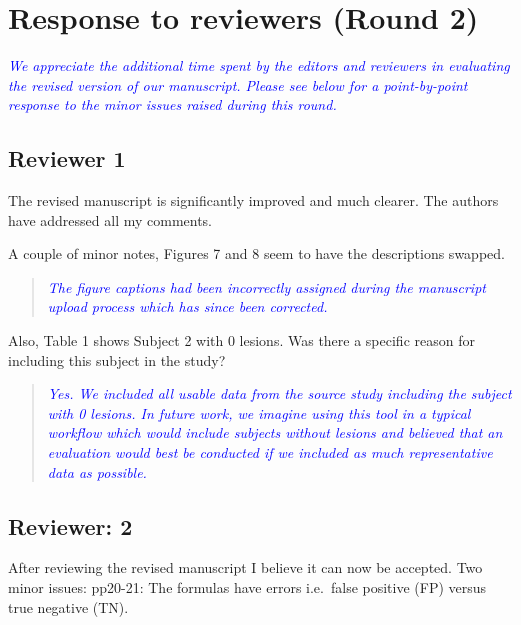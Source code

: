 \documentclass[12pt,]{article}
\title{}
\author{}
\date{}
\begin{document}
\maketitle

\section{Response to reviewers (Round
2)}\label{response-to-reviewers-round-2}

\emph{\textcolor{blue}{We appreciate the additional time spent by the editors and
reviewers in evaluating the revised version of our manuscript.
Please see below for a point-by-point response to the minor issues raised
during this round.}}

\subsection{Reviewer 1}\label{reviewer-1}

The revised manuscript is significantly improved and much clearer. The
authors have addressed all my comments.

A couple of minor notes, Figures 7 and 8 seem to have the descriptions
swapped.

\begin{quote}
\emph{\textcolor{blue}{The figure captions had been incorrectly assigned during the
manuscript upload process which has since been corrected.}}
\end{quote}

Also, Table 1 shows Subject 2 with 0 lesions. Was there a specific
reason for including this subject in the study?

\begin{quote}
\emph{\textcolor{blue}{Yes.  We included all usable data from the source study including
the subject with 0 lesions.  In future work, we imagine using this tool in a typical
workflow which would include subjects without lesions and believed that an evaluation would
best be conducted if we included as much representative data as possible.
}}
\end{quote}

\subsection{Reviewer: 2}\label{reviewer-2}

After reviewing the revised manuscript I believe it can now be accepted.
Two minor issues: pp20-21: The formulas have errors i.e.~false positive
(FP) versus true negative (TN).
\end{document}
